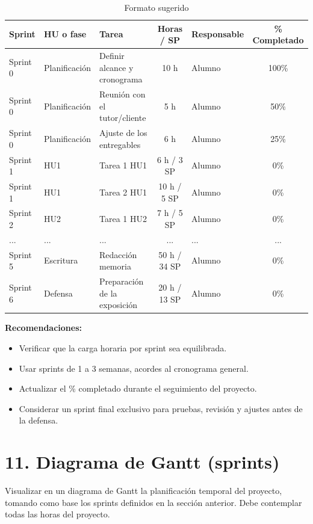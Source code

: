 \documentclass[
11pt, %
codirector, %
]{charter}
\begin{document}
\begin{table}[htpb]
\centering
\caption{Formato sugerido}
\begin{tabularx}{\linewidth}{@{}|l|l|X|c|l|c|@{}}
\hline
\rowcolor[HTML]{C0C0C0}
Sprint & HU o fase & Tarea & Horas / SP & Responsable & \% Completado \\ \hline
Sprint 0 & Planificación & Definir alcance y cronograma & 10 h & Alumno & 100\% \\ \hline
Sprint 0 & Planificación & Reunión con el tutor/cliente & 5 h & Alumno & 50\% \\ \hline
Sprint 0 & Planificación & Ajuste de los entregables & 6 h & Alumno & 25\% \\ \hline
Sprint 1 & HU1 & Tarea 1 HU1 & 6 h / 3 SP & Alumno & 0\% \\ \hline
Sprint 1 & HU1 & Tarea 2 HU1 & 10 h / 5 SP & Alumno & 0\% \\ \hline
Sprint 2 & HU2 & Tarea 1 HU2 & 7 h / 5 SP & Alumno & 0\% \\ \hline
... & ... & ... & ... & ... & ... \\ \hline
Sprint 5 & Escritura & Redacción memoria & 50 h / 34 SP & Alumno & 0\% \\ \hline
Sprint 6 & Defensa & Preparación de la exposición & 20 h / 13 SP & Alumno & 0\% \\ \hline
\end{tabularx}
\end{table}

\textbf{Recomendaciones:}
\begin{itemize}
  \item Verificar que la carga horaria por sprint sea equilibrada.
  \item Usar sprints de 1 a 3 semanas, acordes al cronograma general.
  \item Actualizar el \% completado durante el seguimiento del proyecto.
  \item Considerar un sprint final exclusivo para pruebas, revisión y ajustes antes de la defensa.
\end{itemize}


\section{11. Diagrama de Gantt (sprints)}
\label{sec:gantt}

Visualizar en un diagrama de Gantt la planificación temporal del proyecto, tomando como base los sprints definidos en la sección anterior. Debe contemplar todas las horas del proyecto.
\end{document}

